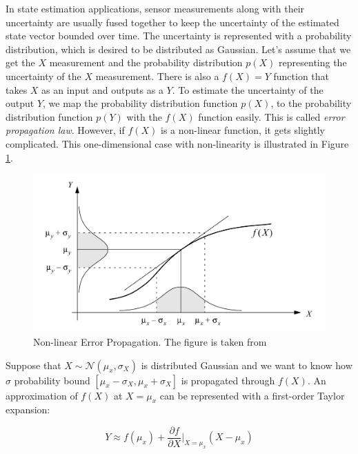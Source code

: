 \documentclass[12pt]{report}
\numberwithin{figure}{section}
\begin{document}
\begin{appendices}
In state estimation applications, sensor measurements along with their uncertainty are 
usually fused together to keep the uncertainty of the estimated state vector 
bounded 
over time. 
The uncertainty is represented with a probability distribution, 
which is desired to be distributed as Gaussian. 
Let's assume that we get the $X$ measurement and the probability distribution 
$p(X)$ representing the uncertainty of the $X$ measurement. 
There is also a $f(X)=Y$ function that takes $X$ as an input and outputs 
as a $Y$. 
To estimate the uncertainty of the output $Y$, 
we map the probability distribution function $p(X)$, 
to the probability distribution function $p(Y)$ with the $f(X)$ function 
easily.
This is called 
\textit{error propagation law}. However, if $f(X)$ is a non-linear function, 
it gets slightly complicated. This one-dimensional case with non-linearity is 
illustrated in Figure \ref{fig:error_propagation}.

\begin{figure}[H]
	\centering
	\includegraphics[width=\linewidth,natwidth=640,natheight=640]
	{fig/ref_imgs/error_propagation.jpg}
\caption[Non-linear Error Propagation]
{Non-linear Error Propagation. The figure is taken from 
\parencite{Arras1998b}}
  \label{fig:error_propagation}
\end{figure}

Suppose that $X\sim \mathcal{N}(\mu_x, \sigma_X)$ is distributed Gaussian 
and we want to know how $\sigma$ probability bound 
$[\mu_x-\sigma_X, \mu_x+\sigma_X]$ is propagated through $f(X)$.
An approximation of $f(X)$ at $X=\mu_x$ can be represented with 
a first-order Taylor expansion:

\begin{equation}
  Y \approx f(\mu_x) + \frac{\partial f}{\partial X}\bigg|_{X=\mu_x} (X-\mu_x) 
\end{equation}


\end{appendices}
\end{document}
